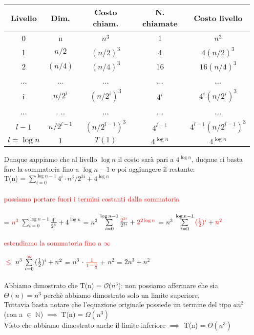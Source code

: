 \documentclass[../cheatSheetAlgoritmi.tex]{subfiles}
\begin{document}
\begin{center}
	\renewcommand{\arraystretch}{1.2}
	\begin{tabular}{ |c|c|c|c|c| } 
		\hline
			Livello & Dim. & Costo chiam. & N. chiamate & Costo livello \\ 
		\hline
			0 & n & $n^3$ & 1 & $n^3$ \\ 
		\hline
			1 & $n/2$ & $(n/2)^{3}$ & 4 & $4(n/2)^{3}$\\ 
		\hline
			2 & $(n/4)$ & $(n/4)^{3}$ & 16 & $16(n/4)^{3}$\\
		\hline
			... & ... & ... & ... & ...\\
		\hline
			i & $n/2^{i}$ & $(n/2^{i})^{3}$ & $4^{i}$ & $4^{i}(n/2^{i})^{3}$\\
		\hline
			... & .	.. & ... & ... & ...\\
		\hline
			$l-1$ & $n/2^{l-1}$ & $(n/2^{l-1})^{3}$ & $4^{l-1}$ & $4^{l-1}(n/2^{l-1})^{3}$\\
		\hline
			$l = \log{n}$ & $1$ & $T(1)$ & $4^{\log{n}}$ & $4^{\log{n}}$\\
		\hline
	\end{tabular}
\end{center}
Dunque sappiamo che al livello $\log{n}$ il costo sarà pari a $4^{\log{n}}$, duqnue ci basta fare la sommatoria fino a $\log{n-1}$ e poi aggiungere il restante:\\
T(n) =  $\sum\limits_{i=0}^{\log{n-1}} {4^{i} \cdot n^{3}/2^{3i}} + 4^{\log{n}}$\\\\
\textcolor{red}{possiamo portare fuori i termini costanti dalla sommatoria}\\\\
= \textcolor{red}{$n^{3}$} $\sum\limits_{i=0}^{\log{n-1}} {\frac{4^{i}}{2^{3i}}} + 4^{\log{n}}$ = $n^{3}$ $\sum\limits_{i=0}^{\log{n-1}} {\frac{\textcolor{red}{2^{2i}}}{2^{3i}}} + \textcolor{red}{2^{2\log{n}}}$ = $n^{3}$ $\sum\limits_{i=0}^{\log{n-1}} {\textcolor{red}{(\frac{1}{2})^{i}}} + \textcolor{red}{n^{2}}$
\newpage
\begin{flushleft}
\textcolor{red}{estendiamo la sommatoria fino a $\infty$}
\end{flushleft}
\textcolor{red}{$\leq$} $n^{3}$ $\sum\limits_{i=0}^{\textcolor{red}{\infty}} {(\frac{1}{2})^{i}} + n^{2}$ = 
$n^{3}$ $\cdot$ \textcolor{red}{$\frac{1}{1-\frac{1}{2}}$} + $n^{2}$ = $2n^{3} + n^2$\\\\
Abbiamo dimostrato che T(n) = $\mathcal{O}$($n^{3}$): non possiamo affermare che sia $\Theta(n) = n^{3}$ perchè abbiamo dimostrato solo un limite superiore.\\
Tuttavia basta notare che l'equazione originale possiede un termine del tipo $an^{3}$ (con a $\in$ $\mathbb{N}$) $\implies$ T(n) = $\Omega(n^{3})$\\  
Visto che abbiamo dimostrato anche il limite inferiore $\implies$ T(n) = $\Theta(n^{3})$ 
\end{document}

